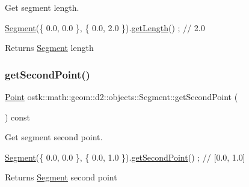 Get segment length. 


\begin{DoxyCode}
\hyperlink{classostk_1_1math_1_1geom_1_1d2_1_1objects_1_1_segment_a56c91f22315d7cefe9d5e9973330028d}{Segment}(\{ 0.0, 0.0 \}, \{ 0.0, 2.0 \}).\hyperlink{classostk_1_1math_1_1geom_1_1d2_1_1objects_1_1_segment_a9e6dcd2b0d921c755b6980f457ed7f3e}{getLength}() ; \textcolor{comment}{// 2.0}
\end{DoxyCode}


\begin{DoxyReturn}{Returns}
\hyperlink{classostk_1_1math_1_1geom_1_1d2_1_1objects_1_1_segment}{Segment} length 
\end{DoxyReturn}
\mbox{\label{classostk_1_1math_1_1geom_1_1d2_1_1objects_1_1_segment_ac2ff9eb997a2cd304b9162dd800bce01}} 
\subsubsection{\texorpdfstring{get\+Second\+Point()}{getSecondPoint()}}
{\footnotesize\ttfamily \hyperlink{classostk_1_1math_1_1geom_1_1d2_1_1objects_1_1_point}{Point} ostk\+::math\+::geom\+::d2\+::objects\+::\+Segment\+::get\+Second\+Point (\begin{DoxyParamCaption}{ }\end{DoxyParamCaption}) const}



Get segment second point. 


\begin{DoxyCode}
\hyperlink{classostk_1_1math_1_1geom_1_1d2_1_1objects_1_1_segment_a56c91f22315d7cefe9d5e9973330028d}{Segment}(\{ 0.0, 0.0 \}, \{ 0.0, 1.0 \}).\hyperlink{classostk_1_1math_1_1geom_1_1d2_1_1objects_1_1_segment_ac2ff9eb997a2cd304b9162dd800bce01}{getSecondPoint}() ; \textcolor{comment}{// [0.0, 1.0]}
\end{DoxyCode}


\begin{DoxyReturn}{Returns}
\hyperlink{classostk_1_1math_1_1geom_1_1d2_1_1objects_1_1_segment}{Segment} second point 
\end{DoxyReturn}
\mbox{\label{classostk_1_1math_1_1geom_1_1d2_1_1objects_1_1_segment_a4e7397f14fd36b0aecd7afddd4fddf84}} 
